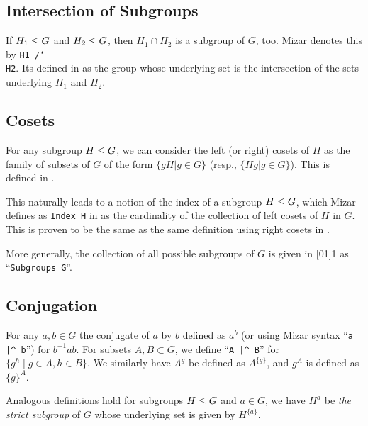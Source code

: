 \subsection{Intersection of Subgroups}
If $H_{1}\leq G$ and $H_{2}\leq G$, then $H_{1}\cap H_{2}$ is
a subgroup of $G$, too. Mizar denotes this by
\texttt{H1 /\char`\\{} H2}. Its
defined in  as the group whose
underlying set is the intersection of the sets underlying $H_{1}$ and $H_{2}$.

\subsection{Cosets}
For any subgroup $H\leq G$, we can consider the left (or right)
cosets of $H$ as the family of subsets of $G$ of the form
$\{gH|g\in G\}$ (resp., $\{Hg|g\in G\}$). This is defined in
.

This naturally leads to a notion of the index of a subgroup $H\leq G$,
which Mizar defines as \verb#Index H# in
 as the
cardinality of the collection of left cosets of $H$ in $G$. This is
proven to be the same as the same definition using right cosets in
.

More generally, the collection of all possible subgroups of $G$ is given
in [01]{1} as
``\verb#Subgroups G#''.

\subsection{Conjugation}
For any $a,b\in G$ the conjugate of $a$ by $b$ defined as $a^{b}$ (or
using Mizar syntax ``\verb#a |^ b#'')
for $b^{-1}ab$. For subsets $A,B\subset G$, we define
``\verb#A |^ B#'' for $\{g^{h}\mid g\in A,h\in B\}$. We similarly have
$A^{g}$ be defined as $A^{\{g\}}$, and $g^{A}$ is defined as $\{g\}^{A}$.

Analogous definitions hold for subgroups $H\leq G$ and $a\in G$, we
have $H^{a}$ be \emph{the strict subgroup} of $G$ whose underlying set
is given by $H^{\{a\}}$.

